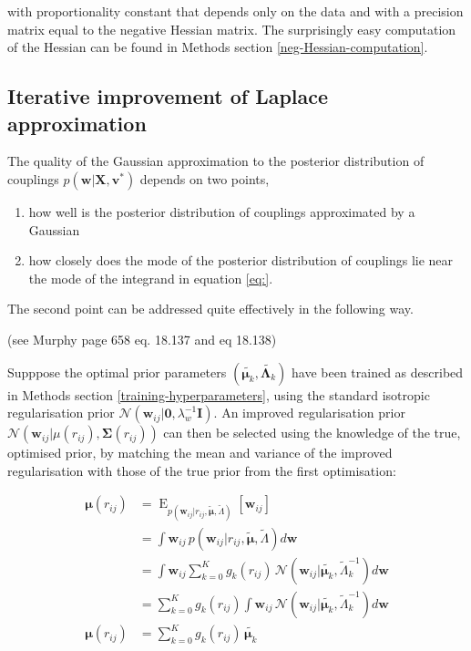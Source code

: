 \documentclass[11pt,a4paper,twoside]{book}
\providecommand{\tightlist}{%
  \setlength{\itemsep}{0pt}\setlength{\parskip}{0pt}}
\newcommand{\Gauss}{\mathcal{N}}
\newcommand{\I}{\mathbf{I}}
\newcommand{\Lk}{\mathbf{\Lambda}_k}
\newcommand{\muk}{\mathbf{\mu}_k}
\newcommand{\rij}{r_{ij}}
\renewcommand{\v}{\mathbf{v}}
\newcommand{\w}{\mathbf{w}}
\newcommand{\wij}{\mathbf{w}_{ij}}
\newcommand{\X}{\mathbf{X}}
\theoremstyle{definition}
\theoremstyle{definition}
\theoremstyle{remark}
\begin{document}
with proportionality constant that depends only on the data and with a
precision matrix equal to the negative Hessian matrix. The surprisingly
easy computation of the Hessian can be found in Methods section
\ref{neg-Hessian-computation}.

\subsection{Iterative improvement of Laplace
approximation}\label{laplace-approx-improvement}

The quality of the Gaussian approximation to the posterior distribution
of couplings \(p(\w | \X , \v^*)\) depends on two points,

\begin{enumerate}
\def\labelenumi{\arabic{enumi}.}
\tightlist
\item
  how well is the posterior distribution of couplings approximated by a
  Gaussian
\item
  how closely does the mode of the posterior distribution of couplings
  lie near the mode of the integrand in equation \ref{eq:}.
\end{enumerate}

The second point can be addressed quite effectively in the following
way.

(see Murphy page 658 eq. 18.137 and eq 18.138)

Supppose the optimal prior parameters \((\tilde{\muk}, \tilde{\Lk})\)
have been trained as described in Methods section
\ref{training-hyperparameters}, using the standard isotropic
regularisation prior
\(\Gauss(\w_{ij} | \mathbf{0}, \lambda_w^{-1} \I)\). An improved
regularisation prior
\(\Gauss( \wij | \mu(r_{ij}), \mathbf{\Sigma}(r_{ij}))\) can then be
selected using the knowledge of the true, optimised prior, by matching
the mean and variance of the improved regularisation with those of the
true prior from the first optimisation:

\begin{align} 
    \mathbf{\mu}(r_{ij}) &= \operatorname{E}_{p( \wij | \rij, \tilde{\mathbf{\mu}}, \tilde{\Lambda})} \left[  \wij \right]  \\
    &= \int \wij \, p( \wij | \rij, \tilde{\mathbf{\mu}}, \tilde{\Lambda}) d \w  \\
    &= \int \wij \sum_{k=0}^K g_k(\rij) \, \Gauss(\wij | \tilde{\muk}, \tilde{\Lambda}_k^{-1})  d \w \\
    &= \sum_{k=0}^K g_k(\rij) \int \wij  \, \Gauss(\wij | \tilde{\muk}, \tilde{\Lambda}_k^{-1})  d \w  \\
    \mathbf{\mu}(r_{ij}) &= \sum_{k=0}^K g_k(\rij) \, \tilde{\muk}
\end{align}
\end{document}
